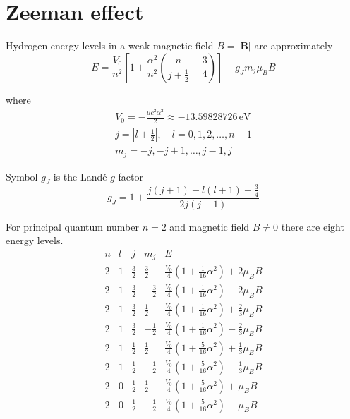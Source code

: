 

\section*{Zeeman effect}

Hydrogen energy levels in a weak magnetic field $B=|\mathbf B|$ are approximately
\begin{equation*}
E=\frac{V_0}{n^2}
\left[
1+\frac{\alpha^2}{n^2}\left(\frac{n}{j+\frac{1}{2}}-\frac{3}{4}\right)
\right]+g_Jm_j\mu_BB
\end{equation*}

where
\begin{gather*}
V_0=-\frac{\mu c^2\alpha^2}{2}\approx-13.59828726\,\text{eV}
\\[1ex]
j=\left|l\pm\tfrac{1}{2}\right|,\quad l=0,1,2,\ldots,n-1
\\[1ex]
m_j=-j,-j+1,\ldots,j-1,j
\end{gather*}

Symbol $g_J$ is the Land\'e $g$-factor
\begin{equation*}
g_J=1+\frac{j(j+1)-l(l+1)+\frac{3}{4}}{2j(j+1)}
\end{equation*}

For principal quantum number $n=2$ and magnetic field $B\ne0$ there are eight energy levels.
\begin{equation*}
\begin{matrix}
n & l & j & m_j & E
\\[2ex]
2 & 1 & \frac{3}{2} & \frac{3}{2} &
\frac{V_0}{4}\left(1+\tfrac{1}{16}\alpha^2\right)+2\mu_BB
\\[2ex]
2 & 1 & \frac{3}{2} & -\frac{3}{2} &
\frac{V_0}{4}\left(1+\tfrac{1}{16}\alpha^2\right)-2\mu_BB
\\[2ex]
2 & 1 & \frac{3}{2} & \frac{1}{2} &
\frac{V_0}{4}\left(1+\tfrac{1}{16}\alpha^2\right)+\frac{2}{3}\mu_BB
\\[2ex]
2 & 1 & \frac{3}{2} & -\frac{1}{2} &
\frac{V_0}{4}\left(1+\tfrac{1}{16}\alpha^2\right)-\frac{2}{3}\mu_BB
\\[2ex]
2 & 1 & \frac{1}{2} & \frac{1}{2} &
\frac{V_0}{4}\left(1+\tfrac{5}{16}\alpha^2\right)+\frac{1}{3}\mu_BB
\\[2ex]
2 & 1 & \frac{1}{2} & -\frac{1}{2} &
\frac{V_0}{4}\left(1+\tfrac{5}{16}\alpha^2\right)-\frac{1}{3}\mu_BB
\\[2ex]
2 & 0 & \frac{1}{2} & \frac{1}{2} &
\frac{V_0}{4}\left(1+\tfrac{5}{16}\alpha^2\right)+\mu_BB
\\[2ex]
2 & 0 & \frac{1}{2} & -\frac{1}{2} &
\frac{V_0}{4}\left(1+\tfrac{5}{16}\alpha^2\right)-\mu_BB
\end{matrix}
\end{equation*}


